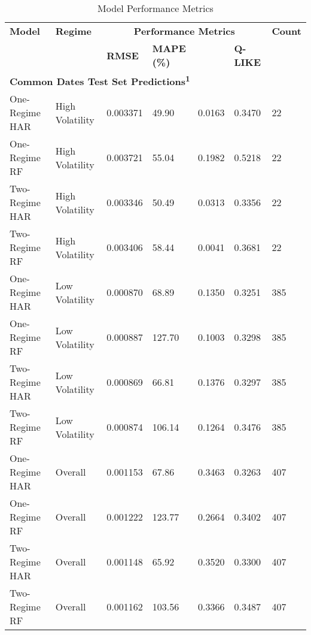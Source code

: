 \documentclass{article}
\begin{document}
	
\begin{table}[htbp]
	\centering
	\caption{Model Performance Metrics}
	\label{tab:model_performance_metrics}
	\begin{tabular}{%
			p{2.9cm}    %
			p{2.7cm}    %
			p{2.1cm}    %
			p{2.1cm}    %
			p{2.1cm}    %
			p{2.1cm}    %
			p{1.2cm}    %
		}
		\toprule
		\textbf{Model} & \textbf{Regime} 
		& \multicolumn{4}{c}{\textbf{Performance Metrics}} & \textbf{Count} \\
		\cmidrule(lr){3-6}
		& & \textbf{RMSE} & \textbf{MAPE (\%)} & \boldmath{$R^2$} & \textbf{Q-LIKE} & \\
		\midrule
		
		\multicolumn{7}{l}{\textbf{Common Dates Test Set Predictions\textsuperscript{1}}} \\
		\midrule
		One-Regime HAR & High Volatility  & 0.003371 & 49.90  & 0.0163 & 0.3470 & 22 \\
		One-Regime RF  & High Volatility  & 0.003721 & 55.04  & 0.1982 & 0.5218 & 22 \\
		Two-Regime HAR & High Volatility  & 0.003346 & 50.49  & 0.0313 & 0.3356 & 22 \\
		Two-Regime RF  & High Volatility  & 0.003406 & 58.44  & 0.0041 & 0.3681 & 22 \\
		\cmidrule(lr){1-7}
		One-Regime HAR & Low Volatility   & 0.000870 & 68.89  & 0.1350 & 0.3251 & 385 \\
		One-Regime RF  & Low Volatility   & 0.000887 & 127.70 & 0.1003 & 0.3298 & 385 \\
		Two-Regime HAR & Low Volatility   & 0.000869 & 66.81  & 0.1376 & 0.3297 & 385 \\
		Two-Regime RF  & Low Volatility   & 0.000874 & 106.14  & 0.1264 & 0.3476 & 385 \\
		\cmidrule(lr){1-7}
		One-Regime HAR & Overall          & 0.001153 & 67.86  & 0.3463 & 0.3263 & 407 \\
		One-Regime RF  & Overall          & 0.001222 & 123.77 & 0.2664 & 0.3402 & 407 \\
		Two-Regime HAR & Overall          & 0.001148 & 65.92  & 0.3520 & 0.3300 & 407 \\
		Two-Regime RF  & Overall          & 0.001162 & 103.56  & 0.3366 & 0.3487 & 407 \\
		\midrule
		

\end{tabular}
\end{table}
\end{document}

